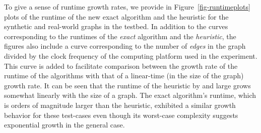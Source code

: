 To give a sense of runtime growth rates, we provide in Figure~\ref{fig-runtimeplots} plots of the 
runtime of the new exact algorithm and the heuristic for the synthetic and real-world graphs 
in the testbed. In addition to the curves corresponding to the runtimes of the
{\em exact} algorithm and the {\em heuristic}, the figures also include a curve corresponding to
the number of {\em edges} in the graph divided by the clock frequency of the computing
platform used in the experiment. This curve is added to facilitate comparison between
the growth rate of the runtime of the algorithms with that of a linear-time (in the size of the graph) growth rate. 
It can be seen that the runtime of the heuristic by and large grows 
somewhat linearly with the size of a graph. The exact algorithm's runtime, which is orders of
magnitude larger than the heuristic, exhibited a similar growth behavior for these test-cases
even though its worst-case complexity suggests exponential growth in the general case. 


